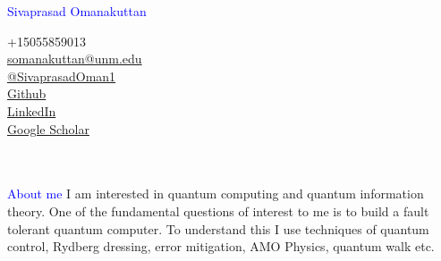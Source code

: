 \documentclass[14pt]{moderncv}
\begin{document}
\makecvtitle
\begin{minipage}{0.5\textwidth} 
\begin{flushleft}
    \textcolor{blue}{\Large Sivaprasad Omanakuttan}
\end{flushleft}
	\vspace{-4pt}
	\color{Blue}
\textcolor{blue}{\phone}{\hspace{0.15cm} +15055859013}   \\                %
\textcolor{blue}{\emailsymbol}\href{mailto:somanakuttan@unm.edu}{\hspace{.2cm}somanakuttan@unm.edu} \\   
\textcolor{blue}{\faTwitter} \href{https://twitter.com/SivaprasadOman1}{\hspace{0.15cm}@SivaprasadOman1}\\
\textcolor{blue}{\faGithub} \href{https://github.com/somanakuttan}{\hspace{0.15cm} Github}\\
\textcolor{blue}{\faLinkedin} \href{https://www.linkedin.com/in/sivaprasad-omanakuttan-b26971227/}{\hspace{0.15cm} LinkedIn}\\
\textcolor{blue}{\faGooglePlus} \href{https://scholar.google.com/citations?user=4_fuQdUAAAAJ&hl=en}{\hspace{0.15cm}Google Scholar}
%

     





	
\end{minipage}
\begin{minipage}{0.5\textwidth} 
	\vspace{-\baselineskip} %
\vspace{.3cm}
   \\\\ 	
\textcolor{blue}{About me} I am interested in quantum computing
and quantum information theory. One of the fundamental questions of interest to me is to build a fault tolerant quantum computer. To understand this I use techniques of quantum control, Rydberg dressing, error mitigation, AMO Physics, quantum walk etc.
	
  



\end{minipage}
\\\\
\end{document}
